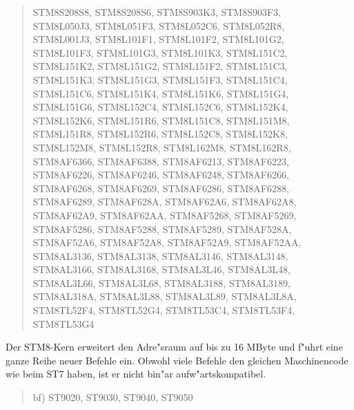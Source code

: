 \documentclass[12pt,a4paper,twoside]{report}
\begin{document}
\begin{quote}
    STM8S208S8, STM8S208S6, STM8S903K3, STM8S903F3,\\
    STM8L050J3, STM8L051F3, STM8L052C6, STM8L052R8,\\
    STM8L001J3, STM8L101F1, STM8L101F2, STM8L101G2,\\
    STM8L101F3, STM8L101G3, STM8L101K3, STM8L151C2,\\
    STM8L151K2, STM8L151G2, STM8L151F2, STM8L151C3,\\
    STM8L151K3, STM8L151G3, STM8L151F3, STM8L151C4,\\
    STM8L151C6, STM8L151K4, STM8L151K6, STM8L151G4,\\
    STM8L151G6, STM8L152C4, STM8L152C6, STM8L152K4,\\
    STM8L152K6, STM8L151R6, STM8L151C8, STM8L151M8,\\
    STM8L151R8, STM8L152R6, STM8L152C8, STM8L152K8,\\
    STM8L152M8, STM8L152R8, STM8L162M8, STM8L162R8,\\
    STM8AF6366, STM8AF6388, STM8AF6213, STM8AF6223,\\
    STM8AF6226, STM8AF6246, STM8AF6248, STM8AF6266,\\
    STM8AF6268, STM8AF6269, STM8AF6286, STM8AF6288,\\
    STM8AF6289, STM8AF628A, STM8AF62A6, STM8AF62A8,\\
    STM8AF62A9, STM8AF62AA, STM8AF5268, STM8AF5269,\\
    STM8AF5286, STM8AF5288, STM8AF5289, STM8AF528A,\\
    STM8AF52A6, STM8AF52A8, STM8AF52A9, STM8AF52AA,\\
    STM8AL3136, STM8AL3138, STM8AL3146, STM8AL3148,\\
    STM8AL3166, STM8AL3168, STM8AL3L46, STM8AL3L48,\\
    STM8AL3L66, STM8AL3L68, STM8AL3188, STM8AL3189,\\
    STM8AL318A, STM8AL3L88, STM8AL3L89, STM8AL3L8A,\\
    STM8TL52F4, STM8TL52G4, STM8TL53C4, STM8TL53F4,\\
    STM8TL53G4
\end{quote}
Der STM8-Kern erweitert den Adre"sraum auf bis zu 16 MByte und f"uhrt
eine ganze Reihe neuer Befehle ein.  Obwohl viele Befehle den
gleichen Maschinencode wie beim ST7 haben, ist er nicht bin"ar
aufw"artskompatibel.
\begin{quote}
bf) ST9020, ST9030, ST9040, ST9050
\end{quote}
\end{document}
